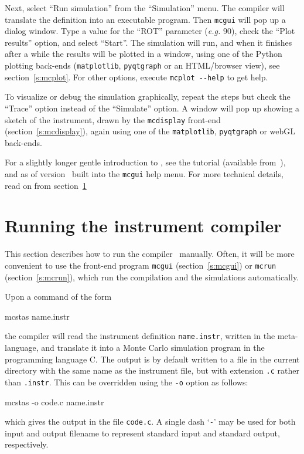 Next, select ``Run simulation'' from the ``Simulation'' menu.
The \MCS compiler \mcs will translate the definition into an executable program.
Then \texttt{mcgui} will pop up a dialog window.
Type a value for the ``ROT'' parameter ({\em e.g.}
90), check the ``Plot results'' option, and select ``Start''. The
simulation will run, and when it finishes after a while the results will
be plotted in a window, using one of the Python plotting back-ends
(\texttt{matplotlib}, \texttt{pyqtgraph} or an HTML/browser view), see
section~\ref{s:mcplot}. For other options, execute
\verb+mcplot --help+ to get help.

To visualize or
debug the simulation graphically, repeat the steps but check the ``Trace''
option instead of the ``Simulate'' option.  A window will pop up showing a
sketch of the instrument, drawn by the \texttt{mcdisplay} front-end
(section~\ref{s:mcdisplay}), again using one of the \texttt{matplotlib},
\texttt{pyqtgraph} or webGL back-ends.

For a slightly longer gentle introduction to \MCS, see the \MCS tutorial
(available from~\cite{mcstas_webpage}), and as of version \version\ built into
the \verb+mcgui+ help menu. For more technical details, read on from
section~\ref{s:running}



\section{Running the instrument compiler}
\label{s:running}

This section describes how to run the \MCS compiler \mcs\ manually. Often,
it will be more convenient to use the front-end program \verb+mcgui+
(section~\ref{s:mcgui}) or \verb+mcrun+ (section~\ref{s:mcrun}),
which run the compilation and the simulations automatically.

Upon a command of the form
\begin{bash}
    mcstas name.instr
\end{bash}
the compiler \mcs will read the instrument definition \verb+name.instr+,
written in the \MCS meta-language,
and translate it into a Monte Carlo simulation program in
the programming language C.
The output is by default written to a file in the current
directory with the same name as the instrument file, but with extension
\verb+.c+ rather than \verb+.instr+. This can be overridden using the
\verb+-o+ option as follows:
\begin{bash}
    mcstas -o code.c name.instr
\end{bash}
which gives the output in the file \verb+code.c+.
A single dash `\verb+-+' may be used for both input and output filename
to represent standard input and standard output, respectively.


